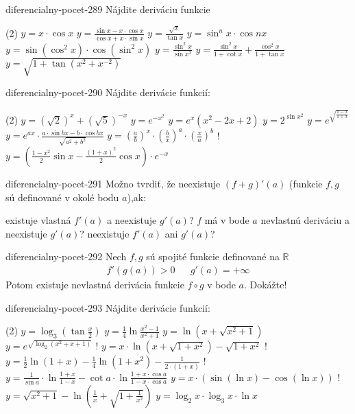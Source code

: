 \begin{defproblem}{diferencialny-pocet-289}
Nájdite deriváciu funkcie
\begin{tasks}(2)
    \task $y=x\cdot\cos x$
    \task $y=\frac{\sin x-x\cdot\cos x}{\cos x+x\cdot\sin x}$
    \task $y=\frac{\sqrt{x}}{\tan x}$
    \task $y=\sin^n x\cdot\cos nx$
    \task $y=\sin (\cos^2 x)\cdot \cos (\sin^2 x)$
    \task $y=\frac{\sin^2 x}{\sin x^2}$
    \task $y=\frac{\sin^2 x}{1+\cot x}+\frac{\cos^2 x}{1+\tan x}$
    \task $y=\sqrt{1+\tan (x^2+x^{-2})}$
\end{tasks}
\end{defproblem}

\begin{defproblem}{diferencialny-pocet-290}
Nájdite derivácie funkcií:
\begin{tasks}(2)
  \task $y = (\sqrt{2})^x+(\sqrt{5})^{-x}$
  \task $y = e^{-x^2}$
  \task $y = e^x(x^2-2x+2)$
  \task $y = 2^{\sin x^2}$
  \task $y = e^{\sqrt{\frac{1-x}{1+x}}}$
  \task $y = e^{ax} \cdot \frac{a \cdot \sin{bx} - b \cdot \cos{bx}}{\sqrt{a^2+b^2}}$
  \task $y = (\frac{a}{b})^x \cdot (\frac{b}{x})^a \cdot (\frac{x}{a})^b$
  \task! $y = (\frac{1-x^2}{2} \sin{x} - \frac{(1+x)^2}{2} \cos{x}) \cdot e^{-x}$
\end{tasks}
\end{defproblem}

\begin{defproblem}{diferencialny-pocet-291}
Možno tvrdiť, že neexistuje $(f+g)'(a)$ (funkcie $f,g$ sú definované v okolé
bodu $a$),ak:
\begin{tasks}
\task existuje vlastná $f'(a)$ a neexistuje $g'(a)$?
\task $f$ má v bode $a$ nevlastnú deriváciu a neexistuje $g'(a)$?
\task neexistuje $f'(a)$ ani $g'(a)$?
\end{tasks}
\end{defproblem}

\begin{defproblem}{diferencialny-pocet-292}
Nech $f,g$ sú spojité funkcie definované na $\mathbb{R}$
\begin{align*}
  f'(g(a)) > 0 && g'(a) = +\infty
\end{align*}
Potom existuje nevlastná derivácia funkcie $f \circ g$ v bode $a$. Dokážte!
\end{defproblem}

\begin{defproblem}{diferencialny-pocet-293}
Nájdite derivácie funkcií:
\begin{tasks}(2)
    \task $y=\log_{3}(\tan \frac{x}{2})$
    \task $y=\frac{1}{4}\ln \frac{x^2-1}{x^2+1}$
    \task $y=\ln (x+\sqrt{x^2+1})$
    \task $y=e^{\sqrt{\log_2(x^2+x+1)}}$
    \task! $y=x\cdot\ln (x+\sqrt{1+x^2})-\sqrt{1+x^2}$
    \task! $y=\frac{1}{2} \ln (1+x)-\frac{1}{4} \ln (1+x^2)-\frac{1}{2\cdot(1+x)}$
    \task! $y=\frac{1}{\sin a}\cdot\ln \frac{1+x}{1-x}-\cot a\cdot\ln \frac{1+x\cdot\cos a}{1-x\cdot\cos a}$
    \task $y=x\cdot(\sin(\ln x)-\cos(\ln x))$
    \task! $y=\sqrt{x^2+1}-\ln (\frac{1}{x}+\sqrt{1+\frac{1}{x^2}})$
    \task $y=\log_2 x\cdot\log_3 x\cdot\ln x$
\end{tasks}
\end{defproblem}

